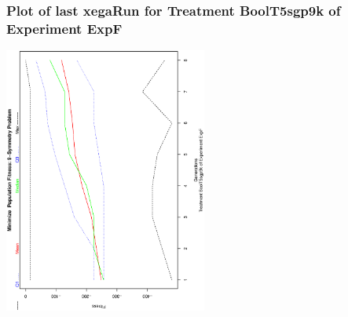  \begin{frame}
 \frametitle{ Plot of last xegaRun for Treatment BoolT5sgp9k of Experiment ExpF }
 \begin{center}
\includegraphics[width=0.5\textwidth, angle=-90]
{ExpFPlotPopStatsFigure010.eps}
 \end{center}
 \label{report/ExpFPlotPopStatsFigure010.eps}  
 \end{frame}

